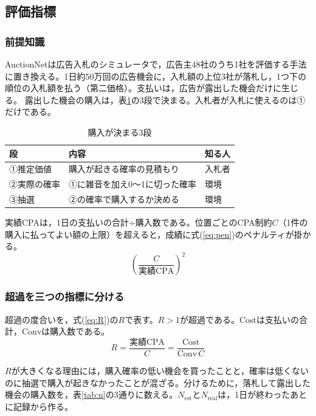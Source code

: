 \documentclass[twocolumn, 10pt]{ujarticle}
\newcommand{\Nest}{N_{\mathrm{est}}}
\newcommand{\Nreal}{N_{\mathrm{real}}}
\newcommand{\Conv}{\mathrm{Conv}}
\newcommand{\Cost}{\mathrm{Cost}}
\begin{document}
\subsection{評価指標}\label{sec:e-index}

\subsubsection{前提知識}\label{sec:pre}

AuctionNetは広告入札のシミュレータで，広告主48社のうち1社を評価する手法に置き換える。1日約50万回の広告機会に，入札額の上位3社が落札し，1つ下の順位の入札額を払う（第二価格）。支払いは，広告が露出した機会だけに生じる。
露出した機会の購入は，表\ref{tab:three}の3段で決まる。入札者が入札に使えるのは①だけである。

\begin{table}[H]
\centering
\caption{購入が決まる3段}
\label{tab:three}
\small
\begin{tabularx}{\linewidth}{@{}>{\raggedright\arraybackslash}p{1.9cm}>{\raggedright\arraybackslash}X>{\raggedright\arraybackslash}p{1.3cm}@{}}
\toprule
段 & 内容 & 知る人 \\
\midrule
①推定価値 & 購入が起きる確率の見積もり & 入札者 \\
②実際の確率 & ①に雑音を加え0〜1に切った確率 & 環境 \\
③抽選 & ②の確率で購入するか決める & 環境 \\
\bottomrule
\end{tabularx}
\end{table}

実績CPAは，1日の支払いの合計÷購入数である。位置ごとのCPA制約$C$（1件の購入に払ってよい額の上限）を超えると，成績に式(\ref{eq:pen})のペナルティが掛かる。
\begin{equation}
\left(\frac{C}{\text{実績CPA}}\right)^{2}
\label{eq:pen}
\end{equation}

\subsubsection{超過を三つの指標に分ける}\label{sec:index}

超過の度合いを，式(\ref{eq:R})の$R$で表す。$R>1$が超過である。$\Cost$は支払いの合計，$\Conv$は購入数である。
\begin{equation}
R=\frac{\text{実績CPA}}{C}=\frac{\Cost}{\Conv\,C}
\label{eq:R}
\end{equation}

$R$が大きくなる理由には，購入確率の低い機会を買ったことと，確率は低くないのに抽選で購入が起きなかったことが混ざる。分けるために，落札して露出した機会の購入数を，表\ref{tab:n}の3通りに数える。$\Nest$と$\Nreal$は，1日が終わったあとに記録から作る。
\end{document}
